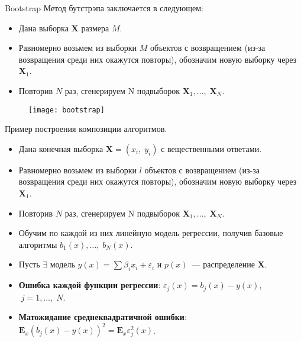 \documentclass[notheorems, handout]{beamer}
\begin{document}
\begin{frame}{Bootstrap}
Метод бутстрэпа заключается в следующем:
\begin{itemize}
	\item Дана выборка $\mathbf{X}$ размера $M$.
	\item Равномерно возьмем из выборки $M$ объектов с возвращением (из-за возвращения среди них окажутся повторы), обозначим новую выборку через $\mathbf{X}_{1}$.
	\item Повторив $N$ раз, сгенерируем N подвыборок $\mathbf{X}_{1}{,} \dots{,}\; \mathbf{X}_{N}$.
\end{itemize}
\par\smallskip
\begin{figure}[h!]
  \texttt{[image: bootstrap]}
\end{figure}
\end{frame}

\begin{frame}{Пример построения композиции алгоритмов.}
\begin{itemize}
	\item Дана конечная выборка $\mathbf{X} = (x_{i}{,}\;y_{i})$ с вещественными ответами.
	\item Равномерно возьмем из выборки $l$ объектов с возвращением (из-за возвращения среди них окажутся повторы), обозначим новую выборку через $\mathbf{X}_{1}$.
	\item Повторив $N$ раз, сгенерируем N подвыборок $\mathbf{X}_{1}{,} \dots{,}\; \mathbf{X}_{N}$.
	\item Обучим по каждой из  них линейную модель регрессии, получив базовые алгоритмы $b_{1}(x), \dots,\; b_{N}(x)$.
	\item Пусть $\exists$ модель $y(x) = \displaystyle\sum \beta_{i}x_{i} + \varepsilon_{i}$ и $p(x)$~--- распределение $\mathbf{X}$.
	\item \textbf{Ошибка каждой функции регрессии}: $\varepsilon_{j}(x) = b_{j}(x) - y(x)$, $\;j = 1, \dots,\;N$.
	\item \textbf{Матожидание среднеквадратичной ошибки}: $\mathbf{E}_{x}{(b_{j}(x) - y(x))}^{2} = \mathbf{E}_{x}\varepsilon_{j}^{2}(x)$.
\end{itemize}
\end{frame}
\end{document}

